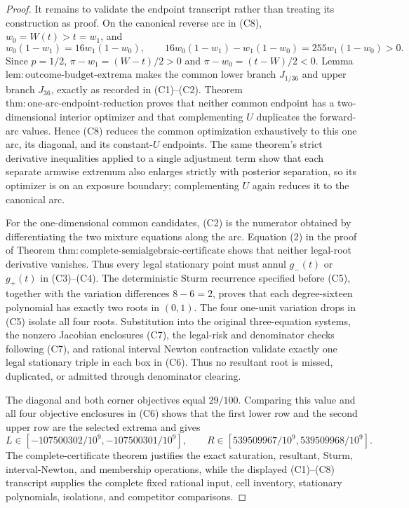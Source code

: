 \documentclass{article}
\begin{document}
\begin{proof}
It remains to validate the endpoint transcript rather than treating its construction as proof.  On the canonical reverse arc in (C8), \(w_0=W(t)>t=w_1\), and
\[
 w_0(1-w_1)=16w_1(1-w_0),
 \qquad
 16w_0(1-w_1)-w_1(1-w_0)=255w_1(1-w_0)>0.                              \tag{17}
\]
Since \(p=1/2\), \(\pi-w_1=(W-t)/2>0\) and \(\pi-w_0=(t-W)/2<0\).  Lemma \(\mathrm{lem{:}outcome\text{-}budget\text{-}extrema}\) makes the common lower branch \(J_{1/36}\) and upper branch \(J_{36}\), exactly as recorded in (C1)--(C2).  Theorem \(\mathrm{thm{:}one\text{-}arc\text{-}endpoint\text{-}reduction}\) proves that neither common endpoint has a two-dimensional interior optimizer and that complementing \(U\) duplicates the forward-arc values.  Hence (C8) reduces the common optimization exhaustively to this one arc, its diagonal, and its constant-\(U\) endpoints.  The same theorem's strict derivative inequalities applied to a single adjustment term show that each separate armwise extremum also enlarges strictly with posterior separation, so its optimizer is on an exposure boundary; complementing \(U\) again reduces it to the canonical arc.

For the one-dimensional common candidates, (C2) is the numerator obtained by differentiating the two mixture equations along the arc.  Equation (2) in the proof of Theorem \(\mathrm{thm{:}complete\text{-}semialgebraic\text{-}certificate}\) shows that neither legal-root derivative vanishes.  Thus every legal stationary point must annul \(g_-(t)\) or \(g_+(t)\) in (C3)--(C4).  The deterministic Sturm recurrence specified before (C5), together with the variation differences \(8-6=2\), proves that each degree-sixteen polynomial has exactly two roots in \((0,1)\).  The four one-unit variation drops in (C5) isolate all four roots.  Substitution into the original three-equation systems, the nonzero Jacobian enclosures (C7), the legal-risk and denominator checks following (C7), and rational interval Newton contraction validate exactly one legal stationary triple in each box in (C6).  Thus no resultant root is missed, duplicated, or admitted through denominator clearing.

The diagonal and both corner objectives equal \(29/100\).  Comparing this value and all four objective enclosures in (C6) shows that the first lower row and the second upper row are the selected extrema and gives
\[
 L\in[-107500302/10^9,-107500301/10^9],
 \qquad
 R\in[539509967/10^9,539509968/10^9].                                  \tag{18}
\]
The complete-certificate theorem justifies the exact saturation, resultant, Sturm, interval-Newton, and membership operations, while the displayed (C1)--(C8) transcript supplies the complete fixed rational input, cell inventory, stationary polynomials, isolations, and competitor comparisons.


\end{proof}
\end{document}
